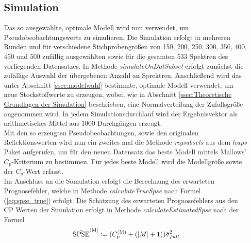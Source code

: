 \subsection{Simulation}
Das so ausgewählte, optimale Modell wird nun verwendet, um Pseudobeobachtungswerte zu simulieren. Die Simulation erfolgt in mehreren Runden und für verschiedene Stichprobengrößen von 150, 200, 250, 300, 350, 400, 450 und 500 zufällig ausgewählten sowie für die gesamten 533 Spektren des vorliegenden Datensatzes. In Methode \textit{simulateOnDatSubset} erfolgt zunächst die zufällige Auswahl der übergebenen Anzahl an Sprektren. Anschließend wird das unter Abschnitt \ref{ssec:modelwahl} bestimmte, optimale Modell verwendet, um neue Stockstoffwerte zu erzeugen, wobei, wie in Abschnitt \ref{ssec:Theoretische Grundlagen der Simulation} beschrieben, eine Normalverteilung der Zufallsgröße angenommen wird. In jedem Simulationsdurchlauf wird der Ergebnisvektor als arithmetisches Mittel aus 1000 Durchgängen erzeugt. \\
Mit den so erzeugten Pseudobeobachtungen, sowie den originalen Reflektionswerten wird nun ein zweites mal die Methode \textit{regsubsets} aus dem \textit{leaps} Paket aufgerufen, um für den neuen Datensatz das beste Modell mittels Mallows' $C_p$-Kriterium zu bestimmen. Für jedes beste Modell wird die Modellgröße sowie der $C_p$-Wert erfasst.\\
Im Anschluss an die Somulation erfolgt die Berechnung des erwarteten Prognosefehler, welche in Methode \textit{calculateTrueSpse} nach Formel (\ref{eq:spse_true}) erfolgt. Die Schätzung des erwarteten Prognosefehlers aus den CP Werten der Simulation erfolgt in Methode \textit{calculateEstimatedSpse} nach der Formel
\[
\hat{\mathrm{SPSE}}^{\mathrm{(M)}} \coloneqq (C_p^{\mathrm{(M)}} + (|M| + 1)) \Tilde{\sigma}^2_{full}
\]



		
